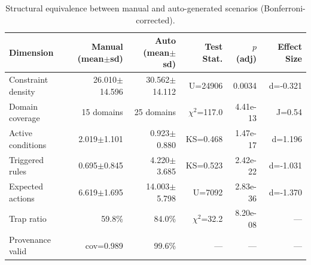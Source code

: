 \begin{table}[htbp]
\centering
\caption{Structural equivalence between manual and auto-generated scenarios (Bonferroni-corrected).}
\label{tab:scenario_equivalence}
\begin{tabular}{lrrrrr}
\toprule
Dimension & Manual (mean$\pm$sd) & Auto (mean$\pm$sd) & Test Stat. & $p$ (adj) & Effect Size \\
\midrule
Constraint density & 26.010$\pm$14.596 & 30.562$\pm$14.112 & U=24906 & 0.0034 & d=-0.321 \\
Domain coverage & 15 domains & 25 domains & $\chi^2$=117.0 & 4.41e-13 & J=0.54 \\
Active conditions & 2.019$\pm$1.101 & 0.923$\pm$0.880 & KS=0.468 & 1.47e-17 & d=1.196 \\
Triggered rules & 0.695$\pm$0.845 & 4.220$\pm$3.685 & KS=0.523 & 2.42e-22 & d=-1.031 \\
Expected actions & 6.619$\pm$1.695 & 14.003$\pm$5.798 & U=7092 & 2.83e-36 & d=-1.370 \\
Trap ratio & 59.8\% & 84.0\% & $\chi^2$=32.2 & 8.20e-08 & --- \\
Provenance valid & cov=0.989 & 99.6\% & --- & --- & --- \\
\bottomrule
\end{tabular}
\end{table}
